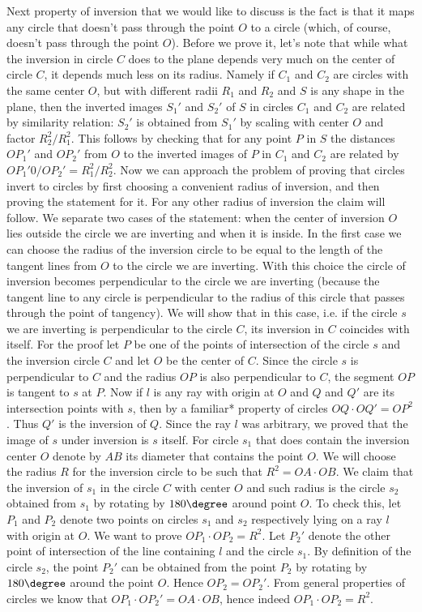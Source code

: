 Next property of inversion that we would like to discuss is the fact is that it maps any circle that doesn't pass through the point $O$ to a circle (which, of course, doesn't pass through the point $O$).
Before we prove it, let's note that while what the inversion in circle $C$ does to the plane depends very much on the center of circle $C$, it depends much less on its radius. Namely if $C_1$ and $C_2$ are circles with the same center $O$, but with different radii $R_1$ and $R_2$ and $S$ is any shape in the plane, then the inverted images $S_1'$ and $S_2'$ of $S$ in circles $C_1$ and $C_2$ are related by similarity relation: $S_2'$ is obtained from $S_1'$ by scaling with center $O$ and factor $R_2^2/R_1^2$. This follows by checking that for any point $P$ in $S$ the distances $OP_1'$ and $OP_2'$ from $O$ to the inverted images of $P$ in $C_1$ and $C_2$ are related by $OP_1'0/OP_2'=R_1^2/R_2^2$.
Now we can approach the problem of proving that circles invert to circles by first choosing a convenient radius of inversion, and then proving the statement for it. For any other radius of inversion the claim will follow.
We separate two cases of the statement: when the center of inversion $O$ lies outside the circle we are inverting and when it is inside.
In the first case we can choose the radius of the inversion circle to be equal to the length of the tangent lines from $O$ to the circle we are inverting. With this choice the circle of inversion becomes perpendicular to the circle we are inverting (because the tangent line to any circle is perpendicular to the radius of this circle that passes through the point of tangency).
We will show that in this case, i.e. if the circle $s$ we are inverting is perpendicular to the circle $C$, its inversion in $C$ coincides with itself.
For the proof let $P$ be one of the points of intersection of the circle $s$ and the inversion circle $C$ and let $O$ be the center of $C$. Since the circle $s$ is perpendicular to $C$ and the radius $OP$ is also perpendicular to $C$, the segment $OP$ is tangent to $s$ at $P$. Now if $l$ is any ray with origin at $O$ and $Q$ and $Q'$ are its intersection points with $s$, then by a familiar* property of circles $OQ\cdot OQ'=OP^2$. Thus $Q'$ is the inversion of $Q$. Since the ray $l$ was arbitrary, we proved that the image of $s$ under inversion is $s$ itself.
For circle $s_1$ that does contain the inversion center $O$ denote by $AB$ its diameter that contains the point $O$. We will choose the radius $R$ for the inversion circle to be such that $R^2=OA\cdot OB$. We claim that the inversion of $s_1$ in the circle $C$ with center $O$ and such radius is the circle $s_2$ obtained from $s_1$ by rotating by $180\degree$ around point $O$. To check this, let $P_1$ and $P_2$ denote two points on circles $s_1$ and $s_2$ respectively lying on a ray $l$ with origin at $O$. We want to prove $OP_1\cdot OP_2=R^2$. Let $P_2'$ denote the other point of intersection of the line containing $l$ and the circle $s_1$. By definition of the circle $s_2$, the point $P_2'$ can be obtained from the point $P_2$ by rotating by $180\degree$ around the point $O$. Hence $OP_2=OP_2'$. From general properties of circles we know that $OP_1\cdot OP_2'=OA\cdot OB$, hence indeed $OP_1\cdot OP_2=R^2$.
